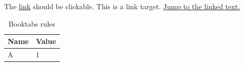 \documentclass[paper=A4]{ropas-poster}
\begin{document}

The \href{https://example.org}{link} should be clickable.
\hypertarget{link-target}{This is a link target.}
\hyperlink{link-target}{Jump to the linked text.}

\begin{table}
\caption{Booktabs rules}
\begin{tabular}{ll}
\toprule
Name & Value \\
\midrule
A & 1 \\
\bottomrule
\end{tabular}
\end{table}
\end{document}
